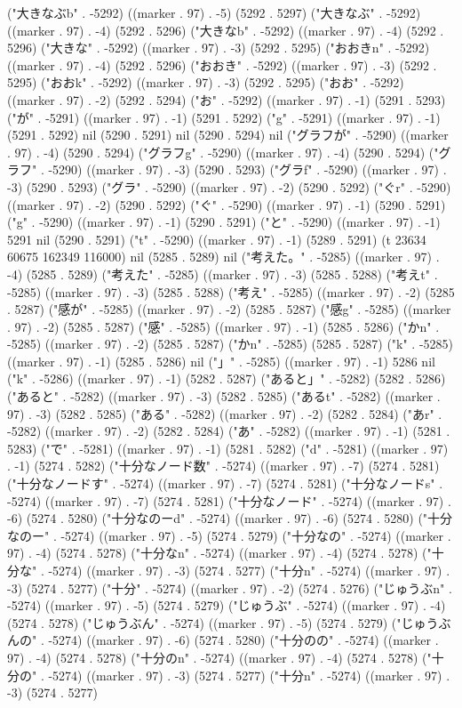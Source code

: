 ("大きなぶb" . -5292) ((marker . 97) . -5) (5292 . 5297) ("大きなぶ" . -5292) ((marker . 97) . -4) (5292 . 5296) ("大きなb" . -5292) ((marker . 97) . -4) (5292 . 5296) ("大きな" . -5292) ((marker . 97) . -3) (5292 . 5295) ("おおきn" . -5292) ((marker . 97) . -4) (5292 . 5296) ("おおき" . -5292) ((marker . 97) . -3) (5292 . 5295) ("おおk" . -5292) ((marker . 97) . -3) (5292 . 5295) ("おお" . -5292) ((marker . 97) . -2) (5292 . 5294) ("お" . -5292) ((marker . 97) . -1) (5291 . 5293) ("が" . -5291) ((marker . 97) . -1) (5291 . 5292) ("g" . -5291) ((marker . 97) . -1) (5291 . 5292) nil (5290 . 5291) nil (5290 . 5294) nil ("グラフが" . -5290) ((marker . 97) . -4) (5290 . 5294) ("グラフg" . -5290) ((marker . 97) . -4) (5290 . 5294) ("グラフ" . -5290) ((marker . 97) . -3) (5290 . 5293) ("グラf" . -5290) ((marker . 97) . -3) (5290 . 5293) ("グラ" . -5290) ((marker . 97) . -2) (5290 . 5292) ("ぐr" . -5290) ((marker . 97) . -2) (5290 . 5292) ("ぐ" . -5290) ((marker . 97) . -1) (5290 . 5291) ("g" . -5290) ((marker . 97) . -1) (5290 . 5291) ("と" . -5290) ((marker . 97) . -1) 5291 nil (5290 . 5291) ("t" . -5290) ((marker . 97) . -1) (5289 . 5291) (t 23634 60675 162349 116000) nil (5285 . 5289) nil ("考えた。" . -5285) ((marker . 97) . -4) (5285 . 5289) ("考えた" . -5285) ((marker . 97) . -3) (5285 . 5288) ("考えt" . -5285) ((marker . 97) . -3) (5285 . 5288) ("考え" . -5285) ((marker . 97) . -2) (5285 . 5287) ("感が" . -5285) ((marker . 97) . -2) (5285 . 5287) ("感g" . -5285) ((marker . 97) . -2) (5285 . 5287) ("感" . -5285) ((marker . 97) . -1) (5285 . 5286) ("かn" . -5285) ((marker . 97) . -2) (5285 . 5287) ("かn" . -5285) (5285 . 5287) ("k" . -5285) ((marker . 97) . -1) (5285 . 5286) nil ("」" . -5285) ((marker . 97) . -1) 5286 nil ("k" . -5286) ((marker . 97) . -1) (5282 . 5287) ("あると」" . -5282) (5282 . 5286) ("あると" . -5282) ((marker . 97) . -3) (5282 . 5285) ("あるt" . -5282) ((marker . 97) . -3) (5282 . 5285) ("ある" . -5282) ((marker . 97) . -2) (5282 . 5284) ("あr" . -5282) ((marker . 97) . -2) (5282 . 5284) ("あ" . -5282) ((marker . 97) . -1) (5281 . 5283) ("で" . -5281) ((marker . 97) . -1) (5281 . 5282) ("d" . -5281) ((marker . 97) . -1) (5274 . 5282) ("十分なノード数" . -5274) ((marker . 97) . -7) (5274 . 5281) ("十分なノードす" . -5274) ((marker . 97) . -7) (5274 . 5281) ("十分なノードs" . -5274) ((marker . 97) . -7) (5274 . 5281) ("十分なノード" . -5274) ((marker . 97) . -6) (5274 . 5280) ("十分なのーd" . -5274) ((marker . 97) . -6) (5274 . 5280) ("十分なのー" . -5274) ((marker . 97) . -5) (5274 . 5279) ("十分なの" . -5274) ((marker . 97) . -4) (5274 . 5278) ("十分なn" . -5274) ((marker . 97) . -4) (5274 . 5278) ("十分な" . -5274) ((marker . 97) . -3) (5274 . 5277) ("十分n" . -5274) ((marker . 97) . -3) (5274 . 5277) ("十分" . -5274) ((marker . 97) . -2) (5274 . 5276) ("じゅうぶn" . -5274) ((marker . 97) . -5) (5274 . 5279) ("じゅうぶ" . -5274) ((marker . 97) . -4) (5274 . 5278) ("じゅうぶん" . -5274) ((marker . 97) . -5) (5274 . 5279) ("じゅうぶんの" . -5274) ((marker . 97) . -6) (5274 . 5280) ("十分のの" . -5274) ((marker . 97) . -4) (5274 . 5278) ("十分のn" . -5274) ((marker . 97) . -4) (5274 . 5278) ("十分の" . -5274) ((marker . 97) . -3) (5274 . 5277) ("十分n" . -5274) ((marker . 97) . -3) (5274 . 5277) 